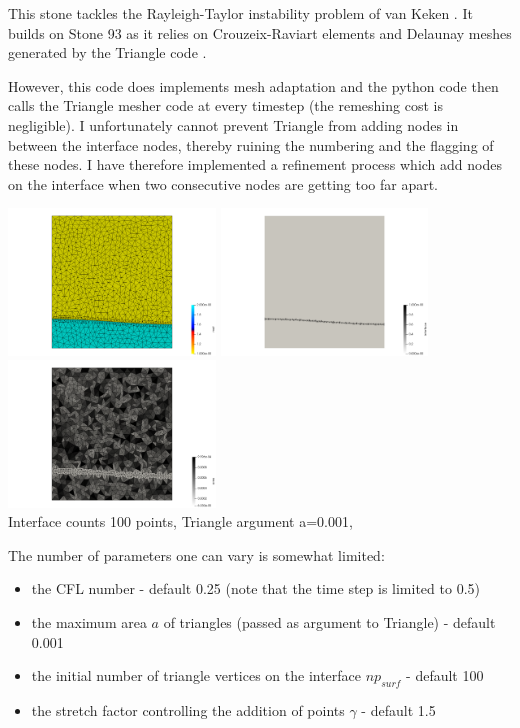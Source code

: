 

This stone tackles the Rayleigh-Taylor instability problem of van Keken \etal \cite{vaks97}. 
It builds on Stone 93 as it relies on Crouzeix-Raviart elements and Delaunay meshes
generated by the Triangle code \cite{shew14}.  

However, this code does implements mesh adaptation and the python code then calls the Triangle mesher code
at every timestep (the remeshing cost is negligible).
I unfortunately cannot prevent Triangle from adding nodes in between the interface nodes, thereby 
ruining the numbering and the flagging of these nodes. I have therefore implemented a refinement 
process which add nodes on the interface when two consecutive nodes are getting too far apart. 


\begin{center}
\includegraphics[width=5.5cm]{python_codes/fieldstone_95/init/mat}
\includegraphics[width=5.5cm]{python_codes/fieldstone_95/init/interface}
\includegraphics[width=5.5cm]{python_codes/fieldstone_95/init/area}\\
{\captionfont Interface counts 100 points, Triangle argument a=0.001, } 
\end{center}

The number of parameters one can vary is somewhat limited:
\begin{itemize}
\item the CFL number - default 0.25 (note that the time step is limited to 0.5)
\item the maximum area $a$ of triangles (passed as argument to Triangle) - default 0.001
\item the initial number of triangle vertices on the interface $np_{surf}$ - default 100
\item the stretch factor controlling the addition of points $\gamma$ - default 1.5
\end{itemize}

